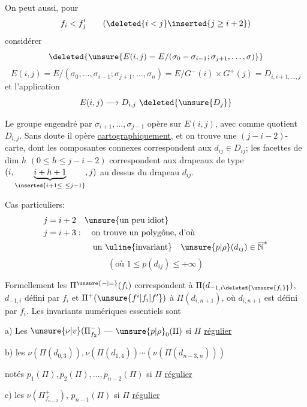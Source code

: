 On peut aussi, pour  
\[
f_i<f'_j\qquad(\deleted{i<j}\inserted{j\geq i+2})
\]
considérer
\[
\deleted{\unsure{E(i,j)=E/(\sigma_0-\sigma_{i-1};\sigma_{j+1},\ldots,\sigma)}}
\]
\[
E(i,j)=E/(\sigma_0,\ldots,\sigma_{i-1};\sigma_{j+1},\ldots,\sigma_n)
=E/G^-(i)\times G^+(j)=D_{i,i+1,\ldots,j}
\]
et l'application
\[
E(i,j)\longrightarrow D_{i,j}\ \deleted{\unsure{D_j}}
\]

Le groupe engendré par $\sigma_{i+1},\ldots,\sigma_{j-1}$ opère sur $E(i,j)$, avec comme quotient $D_{i,j}$. Sans doute il opère \uline{cartographiquement}, et on trouve une $(j-i-2)$-carte, dont les composantes connexes correspondent aux $d_{ij}\in D_{ij}$;  les facettes de dim $h$ $(0\leq h\leq j-i-2)$ correspondent aux drapeaux de type $(i,\underbrace{i+h+1}_{\inserted{i+1\leq\ \leq j-1}},j)$ au dessus du drapeau $d_{ij}$.

Cas particuliers:
\[
\begin{aligned}
j=i+2&\quad\text{\unsure{un peu idiot}}\\
j=i+3&:\quad\text{on trouve un polygône, d'où}\\
&\qquad\text{un \uline{invariant}}\quad\unsure{p|\rho}(d_{ij})\in\overline{\mathbb{N}}^*
\end{aligned}
\]
\[
(\text{où }1\leq p(d_{ij})\leq+\infty)
\]

Formellement les $\Pi^{\unsure{-|=}}(f_i)$ correspondent à  $\Pi(d_{-1,i\deleted{\unsure{f_i}}})$, $d_{-1,i}$ défini par $f_i$   et $\Pi^+(\unsure{f^i|f_i|f'})$  à $\Pi(d_{i,n+1})$, où $d_{i,n+1}$ est défini par $f_i$. Les invariants numériques
essentiels sont

a) Les $\unsure{\nu|v}(\Pi^-_{f_2})$ ---  $\unsure{p|\rho}_0(\Pi)$ si $\Pi$ \uline{régulier}

b) les $\nu(\Pi(d_{0,3})),\nu(\Pi(d_{1,4}))\cdots(\nu(\Pi(d_{n-3,n})))$

notés $p_1(\Pi),p_2(\Pi),\ldots,p_{n-2}(\Pi)$ si $\Pi$ \uline{régulier}

c) les $\nu(\Pi^+_{f_{n-2}})$,  $p_{n-1}(\Pi)$ si $\Pi$ \uline{régulier}

